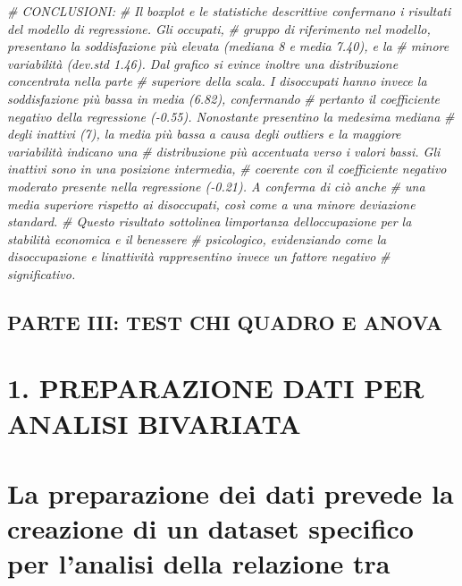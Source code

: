 \documentclass[
]{article}
\newenvironment{Shaded}{\begin{snugshade}}{\end{snugshade}}
\newcommand{\CommentTok}[1]{\textcolor[rgb]{0.56,0.35,0.01}{\textit{#1}}}
\begin{document}
\begin{Shaded}
\begin{Highlighting}[]
\CommentTok{\# CONCLUSIONI:}
\CommentTok{\# Il boxplot e le statistiche descrittive confermano i risultati del modello di regressione. Gli occupati,}
\CommentTok{\# gruppo di riferimento nel modello, presentano la soddisfazione più elevata (mediana 8 e media 7.40), e la}
\CommentTok{\# minore variabilità (dev.std 1.46). Dal grafico si evince inoltre una distribuzione concentrata nella parte}
\CommentTok{\# superiore della scala. I disoccupati hanno invece la soddisfazione più bassa in media (6.82), confermando}
\CommentTok{\# pertanto il coefficiente negativo della regressione ({-}0.55). Nonostante presentino la medesima mediana}
\CommentTok{\# degli inattivi (7), la media più bassa a causa degli outliers e la maggiore variabilità indicano una}
\CommentTok{\# distribuzione più accentuata verso i valori bassi. Gli inattivi sono in una posizione intermedia, }
\CommentTok{\# coerente con il coefficiente negativo moderato presente nella regressione ({-}0.21). A conferma di ciò anche}
\CommentTok{\# una media superiore rispetto ai disoccupati, così come a una minore deviazione standard. }
\CommentTok{\# Questo risultato sottolinea l\textquotesingle{}importanza dell\textquotesingle{}occupazione per la stabilità economica e il benessere }
\CommentTok{\# psicologico, evidenziando come la disoccupazione e l\textquotesingle{}inattività rappresentino invece un fattore negativo}
\CommentTok{\# significativo.}
\end{Highlighting}
\end{Shaded}

\subsection{PARTE III: TEST CHI QUADRO E
ANOVA}\label{parte-iii-test-chi-quadro-e-anova}

\section{1. PREPARAZIONE DATI PER ANALISI
BIVARIATA}\label{preparazione-dati-per-analisi-bivariata}

\section{La preparazione dei dati prevede la creazione di un dataset
specifico per l'analisi della relazione
tra}\label{la-preparazione-dei-dati-prevede-la-creazione-di-un-dataset-specifico-per-lanalisi-della-relazione-tra}
\end{document}
